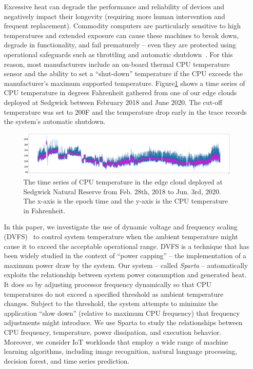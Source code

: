 Excessive heat can degrade the performance and reliability of devices and negatively impact their longevity (requiring more human intervention and frequent replacement). Commodity computers are particularly sensitive to high temperatures and extended exposure can cause these machines to break down, degrade in functionality, and fail prematurely -- even they are protected using operational safeguards such as throttling and automatic shutdown~\cite{ref:overheating}. For this reason, most manufacturers include an on-board thermal CPU temperature sensor and the ability to set a ``shut-down'' temperature if the CPU exceeds the manufacturer's maximum supported temperature. Figure\ref{fig:time_series} shows a time series of CPU temperature in degrees Fahrenheit gathered from one of our edge clouds deployed at Sedgwick between February 2018 and June 2020. The cut-off temperature was set to 200\degree F and the temperature drop early in the trace records the system's automatic shutdown.

\begin{figure}
\includegraphics[width=\textwidth]{figures/time_series.png}
\caption{The time series of CPU temperature in the edge cloud deployed at Sedgwick Natural Reserve from Feb. 28th, 2018 to Jun. 3rd, 2020. The x-axis is the epoch time and the y-axis is the CPU temperature in Fahrenheit. } \label{fig:time_series}
\end{figure}

In this paper, we investigate the use of dynamic voltage and frequency scaling (DVFS)~\cite{ref:Liu2007dvfs,ref:Wang2010dvfs,ref:Wu2013dvfs} to control system temperature when the ambient temperature might cause it to exceed the acceptable operational range. DVFS is a technique that has been widely studied in the context of ``power capping'' -- the implementation of a maximum power draw by the system.  Our system -- called \textit{Sparta} --  automatically exploits the relationship between system power consumption and generated heat.  It does so by adjusting processor frequency dynamically so that CPU temperatures do not exceed a specified threshold as ambient temperature changes.  Subject to the threshold, the system attempts to minimize the application ``slow down'' (relative to maximum CPU frequency) that frequency adjustments might introduce.  
We use Sparta to study the relationships between CPU frequency, temperature, power dissipation, and execution behavior. Moreover, we consider IoT workloads that employ a wide range of machine learning algorithms, including image recognition, natural language processing, decision forest, and time series prediction. 

